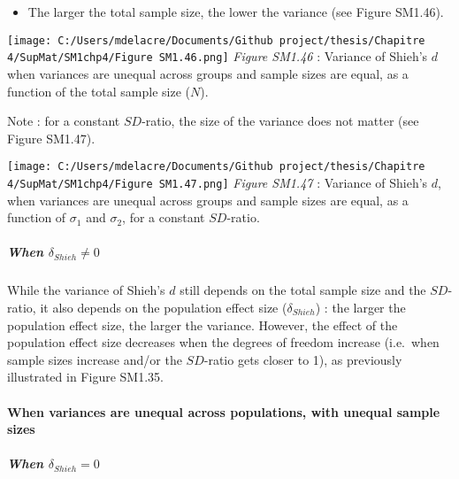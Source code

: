 \documentclass[
  english,
  man,mask,floatsintext]{apa6}
\providecommand{\tightlist}{%
  \setlength{\itemsep}{0pt}\setlength{\parskip}{0pt}}
\let\oldparagraph\paragraph
\renewcommand{\paragraph}[1]{\oldparagraph{#1}\mbox{}}
\let\oldsubparagraph\subparagraph
\renewcommand{\subparagraph}[1]{\oldsubparagraph{#1}\mbox{}}
\begin{document}
\newpage

\begin{itemize}
\tightlist
\item
  The larger the total sample size, the lower the variance (see Figure SM1.46).
\end{itemize}

\texttt{[image: C:/Users/mdelacre/Documents/Github project/thesis/Chapitre 4/SupMat/SM1chp4/Figure SM1.46.png]}
\emph{Figure SM1.46} : Variance of Shieh's \(d\) when variances are unequal across groups and sample sizes are equal, as a function of the total sample size (\(N\)).

\newpage

Note : for a constant \(SD\)-ratio, the size of the variance does not matter (see Figure SM1.47).

\texttt{[image: C:/Users/mdelacre/Documents/Github project/thesis/Chapitre 4/SupMat/SM1chp4/Figure SM1.47.png]}
\emph{Figure SM1.47} : Variance of Shieh's \(d\), when variances are unequal across groups and sample sizes are equal, as a function of \(\sigma_1\) and \(\sigma_2\), for a constant \(SD\)-ratio.

\hypertarget{when-delta_shieh-neq-0-1}{%
\subparagraph{\texorpdfstring{When \(\delta_{Shieh} \neq 0\)}{When \textbackslash delta\_\{Shieh\} \textbackslash neq 0}}\label{when-delta_shieh-neq-0-1}}

While the variance of Shieh's \(d\) still depends on the total sample size and the \(SD\)-ratio, it also depends on the population effect size (\(\delta_{Shieh}\)) : the larger the population effect size, the larger the variance. However, the effect of the population effect size decreases when the degrees of freedom increase (i.e.~when sample sizes increase and/or the \(SD\)-ratio gets closer to 1), as previously illustrated in Figure SM1.35.

\newpage

\hypertarget{when-variances-are-unequal-across-populations-with-unequal-sample-sizes-4}{%
\paragraph{When variances are unequal across populations, with unequal sample sizes}\label{when-variances-are-unequal-across-populations-with-unequal-sample-sizes-4}}

\hypertarget{when-delta_shieh-0-2}{%
\subparagraph{\texorpdfstring{When \(\delta_{Shieh} = 0\)}{When \textbackslash delta\_\{Shieh\} = 0}}\label{when-delta_shieh-0-2}}
\end{document}
